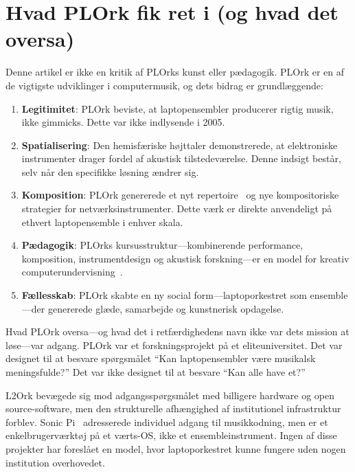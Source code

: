 \documentclass[10pt,letterpaper,twocolumn]{article}
\begin{document}

\section{Hvad PLOrk fik ret i (og hvad det oversa)}
\label{sec:lessons}

Denne artikel er ikke en kritik af PLOrks kunst eller p{\ae}dagogik. PLOrk er en af de vigtigste udviklinger i computermusik, og dets bidrag er grundl{\ae}ggende:

\begin{enumerate}
  \item \textbf{Legitimitet}: PLOrk beviste, at laptopensembler producerer rigtig musik, ikke gimmicks. Dette var ikke indlysende i 2005.
  \item \textbf{Spatialisering}: Den hemisf{\ae}riske h{\o}jttaler demonstrerede, at elektroniske instrumenter drager fordel af akustisk tilstedev{\ae}relse. Denne indsigt best{\aa}r, selv n{\aa}r den specifikke l{\o}sning {\ae}ndrer sig.
  \item \textbf{Komposition}: PLOrk genererede et nyt repertoire~\citep{smallwood2008composing} og nye kompositoriske strategier for netv{\ae}rksinstrumenter. Dette v{\ae}rk er direkte anvendeligt p{\aa} ethvert laptopensemble i enhver skala.
  \item \textbf{P{\ae}dagogik}: PLOrks kursusstruktur---kombinerende performance, komposition, instrumentdesign og akustisk forskning---er en model for kreativ computerundervisning~\citep{trueman2007why}.
  \item \textbf{F{\ae}llesskab}: PLOrk skabte en ny social form---laptoporkestret som ensemble---der genererede gl{\ae}de, samarbejde og kunstnerisk opdagelse.
\end{enumerate}

Hvad PLOrk oversa---og hvad det i retf{\ae}rdighedens navn ikke var dets mission at l{\o}se---var adgang. PLOrk var et forskningsprojekt p{\aa} et eliteuniversitet. Det var designet til at besvare sp{\o}rgsm{\aa}let ``Kan laptopensembler v{\ae}re musikalsk meningsfulde?'' Det var ikke designet til at besvare ``Kan alle have et?''

L2Ork bev{\ae}gede sig mod adgangssp{\o}rgsm{\aa}let med billigere hardware og open source-software, men den strukturelle afh{\ae}ngighed af institutionel infrastruktur forblev. Sonic Pi~\citep{aaron2016sonic} adresserede individuel adgang til musikkodning, men er et enkelbrugerv{\ae}rkt{\o}j p{\aa} et v{\ae}rts-OS, ikke et ensembleinstrument. Ingen af disse projekter har foresl{\aa}et en model, hvor laptoporkestret kunne fungere uden nogen institution overhovedet.
\end{document}
